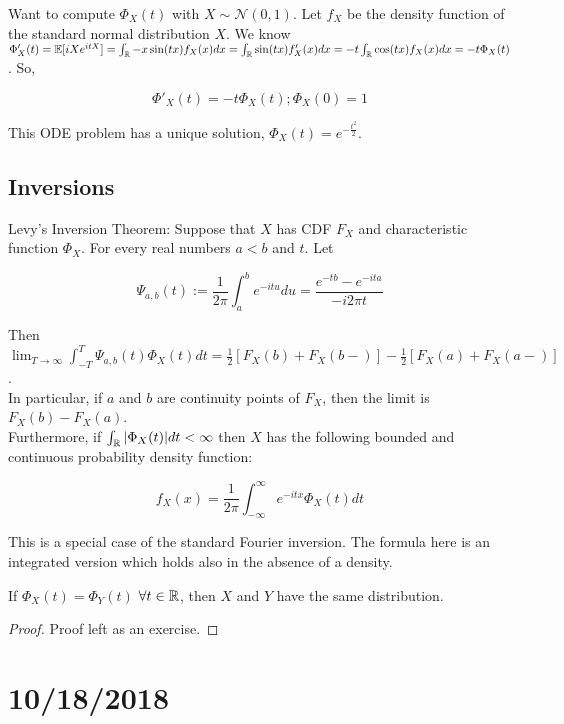 \documentclass[english, course]{Notes}
\begin{document}
Want to compute $\Phi_X(t)$ with $X \sim \mathcal{N}(0, 1)$. Let $f_X$ be the density function of the standard normal distribution $X$. We know $\Phi'_X(t) = \mathbb{E}[iX e^{itX}] = \int_{\mathbb{R}} - x\sin(tx) f_X(x)dx = \int_{\mathbb{R}} \sin(tx) f'_X(x)dx = -t\int_{\mathbb{R}} \cos(tx)f_X(x)dx = -t \Phi_X(t)$. So,

\[\Phi'_X(t) = -t\Phi_X(t); \Phi_X(0) = 1\]

This ODE problem has a unique solution, $\Phi_X(t) = e^{-\frac{t^2}{2}}$.

\subsection{Inversions}
\begin{theorem}
Levy's Inversion Theorem: Suppose that $X$ has CDF $F_X$ and characteristic function $\Phi_X$. For every real numbers $a < b$ and $t$. Let

\[\Psi_{a, b}(t) := \frac{1}{2\pi} \int_a^b e^{-itu} du = \frac{e^{-tb} - e^{-ita}}{-i2\pi t}\]

Then $\lim_{T \to \infty} \int_{-T}^T \Psi_{a, b}(t) \Phi_X(t)dt = \frac{1}{2}[F_X(b) + F_X(b-)] - \frac{1}{2}[F_X(a) + F_X(a-)]$.\\

In particular, if $a$ and $b$ are continuity points of $F_X$, then the limit is $F_X(b) - F_X(a)$.\\

Furthermore, if $\int_{\mathbb{R}} |\Phi_X(t)|dt < \infty$ then $X$ has the following bounded and continuous probability density function:

\[f_X(x) = \frac{1}{2\pi} \int_{-\infty}^\infty e^{-itx} \Phi_X(t)dt\]
\end{theorem}

This is a special case of the standard Fourier inversion. The formula here is an integrated version which holds also in the absence of a density.\\

\begin{corollary}
If $\Phi_X(t) = \Phi_Y(t)$ $\forall t \in \mathbb{R}$, then $X$ and $Y$ have the same distribution.
\end{corollary}

\begin{proof}
Proof left as an exercise.
\end{proof}

\section{10/18/2018}
\end{document}
